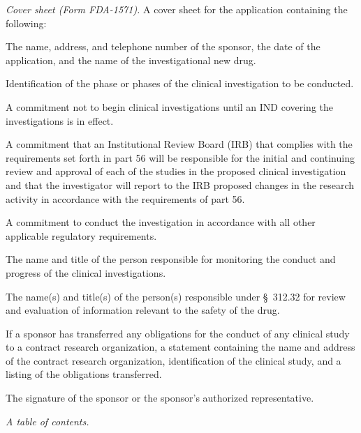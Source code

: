 \begin{description}[leftmargin=0.5cm,style=sameline]
\item[(1)] \textit{Cover sheet (Form FDA-1571).} A cover sheet for the application containing the following:
\begin{description}[leftmargin=0.8cm,style=sameline]
\item[(i)] The name, address, and telephone number of the sponsor, the date of the application, and the name of the investigational new drug.
\item[(ii)] Identification of the phase or phases of the clinical investigation to be conducted.
\item[(iii)] A commitment not to begin clinical investigations until an IND covering the investigations is in effect.
\item[(iv)] A commitment that an Institutional Review Board (IRB) that complies with the requirements set forth in part 56 will be responsible for the initial and continuing review and approval of each of the studies in the proposed clinical investigation and that the investigator will report to the IRB proposed changes in the research activity in accordance with the requirements of part 56.
\item[(v)] A commitment to conduct the investigation in accordance with all other applicable regulatory requirements.
\item[(vi)] The name and title of the person responsible for monitoring the conduct and progress of the clinical investigations.
\item[(vii)] The name(s) and title(s) of the person(s) responsible under \S~312.32 for review and evaluation of information relevant to the safety of the drug.
\item[(viii)] If a sponsor has transferred any obligations for the conduct of any clinical study to a contract research organization, a statement containing the name and address of the contract research organization, identification of the clinical study, and a listing of the obligations transferred.
\item[(ix)] The signature of the sponsor or the sponsor's authorized representative.
\end{description}

\item[(2)] \textit{A table of contents.}


\end{description}
